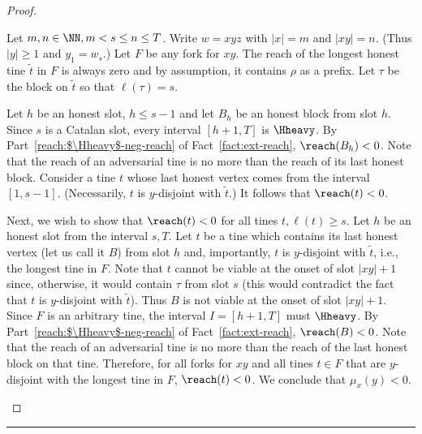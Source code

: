 \begin{proof}
\begin{description}[font=\normalfont\itshape\space]
      \item[Strong-CP implies Part (ii) of event $M$.]
      Let $m, n \in \NN, m < s \leq n \leq T$.
      Write $w = x y z$ with $|x| = m$ and $|x y| = n$. 
      (Thus $|y| \geq 1$ and $y_1 = w_{s}$.)
      Let $F$ be any fork for $x y$. 
      The reach of the longest honest tine $\tilde{t}$ in $F$ is always zero 
      and by assumption, it contains $\rho$ as a prefix. 
      Let $\tau$ be the block on $\tilde{t}$ so that $\ell(\tau) = s$.

      Let $h$ be an honest slot, $h \leq s - 1$ 
      and let $B_h$ be an honest block from slot $h$. 
      Since $s$ is a Catalan slot,         
      every interval $[h + 1, T]$ is $\Hheavy$. 
      By Part~\ref{reach:$\Hheavy$-neg-reach} of Fact~\ref{fact:ext-reach}, 
      $\reach(B_h) < 0$. 
      Note that the reach of an adversarial tine is no more than the reach of its last honest block.
      Consider a tine $t$ whose last honest vertex comes from the interval $[1, s - 1]$. 
      (Necessarily, $t$ is $y$-disjoint with $\tilde{t}$.)
      It follows that $\reach(t) < 0$. 

      Next, we wish to show that $\reach(t) < 0$ for all tines $t, \ell(t) \geq s$.
      Let $h$ be an honest slot from the interval $s, T$. 
      Let $t$ be a tine which contains 
      its last honest vertex (let us call it $B$) from slot $h$ and, 
      importantly, $t$ is $y$-disjoint with $\tilde{t}$, i.e., the longest tine in $F$. 
      Note that $t$ cannot be viable at the onset of slot $|xy| + 1$ since, otherwise,       
      it would contain $\tau$ from slot $s$ 
      (this would contradict the fact that $t$ is $y$-disjoint with $\tilde{t}$). 
      Thus $B$ is not viable at the onset of slot $|xy| + 1$. 
      Since $F$ is an arbitrary tine, the interval $I = [h + 1, T]$ must $\Hheavy$. 
      By Part~\ref{reach:$\Hheavy$-neg-reach} of Fact~\ref{fact:ext-reach}, 
      $\reach(B) < 0$.
      Note that the reach of an adversarial tine 
      is no more than the reach of the last honest block on that tine. 
      Therefore, 
      for all forks for $xy$ and all tines $t \in F$ 
      that are $y$-disjoint with the longest tine in $F$, 
      $\reach(t) < 0$. 
      We conclude that $\mu_x(y) < 0$.
    \end{description}

  \end{proof}
\hrule


